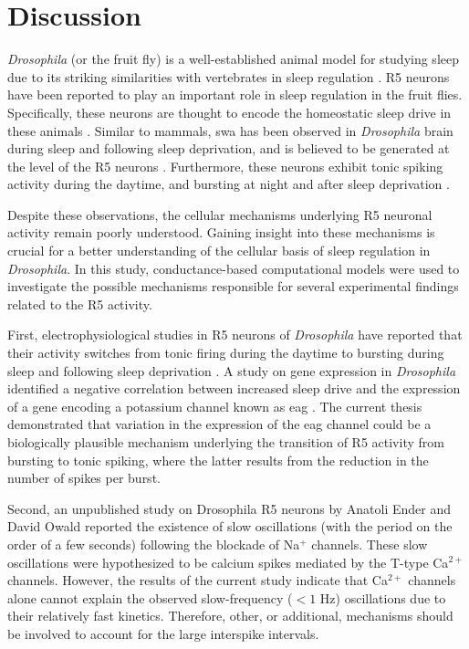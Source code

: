 \documentclass[../main.tex]{subfiles}
\begin{document}
\section{Discussion} \label{sec:discussion}

\textit{Drosophila} (or the fruit fly) is a well-established animal model for studying sleep due to its striking similarities with vertebrates in sleep regulation \parencite{shaferRegulationDrosophilaSleep2021,andreaniCircadianProgrammingEllipsoid2022}. R5 neurons have been reported to play an important role in sleep regulation in the fruit flies. Specifically, these neurons are thought to encode the homeostatic sleep drive in these animals \parencite{liuSleepDriveEncoded2016}. Similar to mammals,
\gls{swa} has been observed in \textit{Drosophila} brain during sleep and following sleep deprivation, and is believed to be generated at the level of the R5 neurons \parencite{raccugliaNetworkSpecificSynchronizationElectrical2019}. Furthermore, these neurons exhibit tonic spiking activity during the daytime, and bursting at night and after sleep deprivation \parencite{suarez-grimaltNeuralArchitectureSleep2021,liuSleepDriveEncoded2016}. 

Despite these observations, the cellular mechanisms underlying R5 neuronal activity remain poorly understood. Gaining insight into these mechanisms is crucial for a better understanding of the cellular basis of sleep regulation in \textit{Drosophila}.
In this study, conductance-based computational models were used to investigate the possible mechanisms responsible for several experimental findings related to the R5 activity.

First, electrophysiological studies in R5 neurons of \textit{Drosophila} have reported that their activity switches from tonic firing during the daytime to bursting during sleep and following sleep deprivation \parencite{liuSleepDriveEncoded2016,suarez-grimaltNeuralArchitectureSleep2021}. A study on gene expression in \textit{Drosophila} identified a negative correlation between increased sleep drive and the expression of a gene encoding a potassium channel known as \gls{eag} \parencite{doppSinglecellTranscriptomicsReveals2024}. The current thesis demonstrated that variation in the expression of the \gls{eag} channel could be a biologically plausible mechanism underlying the transition of R5 activity from bursting to tonic spiking, where the latter results from the reduction in the number of spikes per burst.

Second, an unpublished study on Drosophila R5 neurons by Anatoli Ender and David Owald reported the existence of slow oscillations (with the period on the order of a few seconds) following the blockade of Na$^+$ channels. These slow oscillations were hypothesized to be calcium spikes mediated by the T-type Ca$^{2+}$ channels. However, the results of the current study indicate that Ca$^{2+}$ channels alone cannot explain the observed slow-frequency ($<1$ Hz) oscillations due to their relatively fast kinetics. Therefore, other, or additional, mechanisms should be involved to account for the large interspike intervals.
\end{document}
